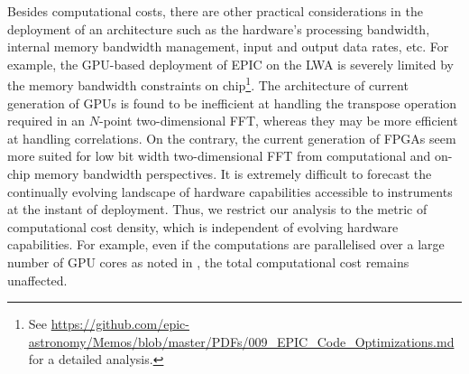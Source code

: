 \documentclass[
  journal=pasa,
  manuscript=article-type,
  year=2020,
  volume=37,
]{cup-journal}
\begin{document}
Besides computational costs, there are other practical considerations in the deployment of an architecture such as the hardware's processing bandwidth, internal memory bandwidth management, input and output data rates, etc. For example, the GPU-based deployment of EPIC on the LWA is severely limited by the memory bandwidth constraints on chip\footnote{See \url{https://github.com/epic-astronomy/Memos/blob/master/PDFs/009_EPIC_Code_Optimizations.md} for a detailed analysis.}. The architecture of current generation of GPUs is found to be inefficient at handling the transpose operation required in an $N$-point two-dimensional FFT, whereas they may be more efficient at handling correlations. On the contrary, the current generation of FPGAs seem more suited for low bit width two-dimensional FFT from computational and on-chip memory bandwidth perspectives. It is extremely difficult to forecast the continually evolving landscape of hardware capabilities accessible to instruments at the instant of deployment. Thus, we restrict our analysis to the metric of computational cost density, which is independent of evolving hardware capabilities. For example, even if the computations are parallelised over a large number of GPU cores as noted in \citet{Sokolowski+2024}, the total computational cost remains unaffected. 






\end{document}
